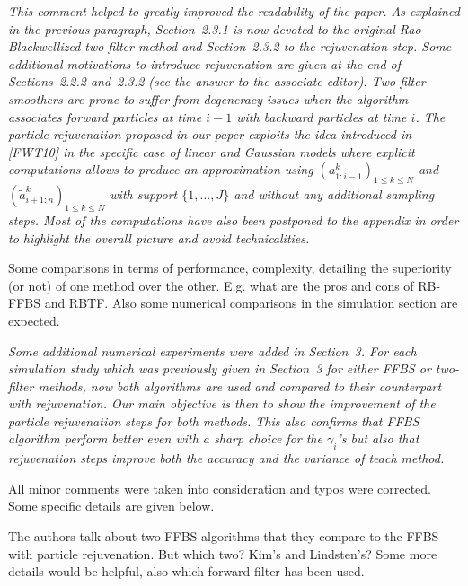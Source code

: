 {\em
\noindent  This comment helped to greatly improved the readability of the paper. As explained in the previous paragraph, Section~2.3.1 is now devoted to the original Rao-Blackwellized two-filter method and Section~2.3.2 to the rejuvenation step. Some additional motivations to introduce rejuvenation are given at the end of Sections~2.2.2 and~2.3.2 (see the answer to the associate editor). Two-filter smoothers are prone to suffer from degeneracy issues when the algorithm associates forward particles at time $i-1$ with backward particles at time $i$. The particle rejuvenation proposed in our paper exploits the idea introduced in [FWT10] in the specific case of linear and Gaussian models where explicit computations allows to produce an approximation using $(a^k_{1:i-1})_{1\le k \le N}$ and $(\tilde{a}^k_{i+1:n})_{1\le k \le N}$ with support $\{1,\ldots,J\}$ and without any additional sampling steps. Most of the computations have also been postponed to the appendix in order to highlight the overall picture and avoid technicalities.
}

\vspace{.5cm}

\noindent Some comparisons in terms of performance, complexity, detailing the superiority (or not) of one method over the other. E.g. what are the pros and cons of RB-FFBS and RBTF. Also some numerical comparisons in the simulation section are expected.

\vspace{.2cm}

{\em
\noindent Some additional numerical experiments were added in Section~3. For each simulation study which was previously given in Section~3 for either FFBS or two-filter methods, now both algorithms are used and compared to their counterpart with rejuvenation. Our main objective is then to show the improvement of the particle rejuvenation steps for both methods.  This also confirms that FFBS algorithm perform better even with a sharp choice for the  $\gamma_i$'s but also that rejuvenation steps improve both the accuracy and the variance of teach method.
}

\vspace{.5cm}

\noindent All minor comments were taken into consideration and typos were corrected. Some specific details are given below.
 
 \vspace{.5cm}
 
 \noindent The authors talk about two FFBS algorithms that they compare to the FFBS with
particle rejuvenation. But which two? Kim's and Lindsten's? Some more details
would be helpful, also which forward filter has been used.


